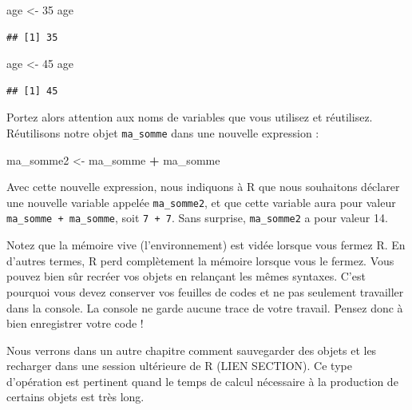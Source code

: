 \documentclass[
  11pt,
  french,
]{book}
\makeatletter
\newenvironment{Shaded}{\begin{snugshade}}{\end{snugshade}}
\newcommand{\DecValTok}[1]{\textcolor[rgb]{0.00,0.00,0.81}{#1}}
\newcommand{\NormalTok}[1]{#1}
\newcommand{\OperatorTok}[1]{\textcolor[rgb]{0.81,0.36,0.00}{\textbf{#1}}}
\newcommand{\StringTok}[1]{\textcolor[rgb]{0.31,0.60,0.02}{#1}}
\newenvironment{kframe}{%
\medskip{}
\setlength{\fboxsep}{.8em}
 \def\at@end@of@kframe{}%
 \ifinner\ifhmode%
  \def\at@end@of@kframe{\end{minipage}}%
  \begin{minipage}{\columnwidth}%
 \fi\fi%
 \def\FrameCommand##1{\hskip\@totalleftmargin \hskip-\fboxsep
 \colorbox{shadecolor}{##1}\hskip-\fboxsep
     \hskip-\linewidth \hskip-\@totalleftmargin \hskip\columnwidth}%
 \MakeFramed {\advance\hsize-\width
   \@totalleftmargin\z@ \linewidth\hsize
   \@setminipage}}%
 {\par\unskip\endMakeFramed%
 \at@end@of@kframe}
\renewenvironment{Shaded}{\begin{kframe}}{\end{kframe}}
\makeatother
\begin{document}
\begin{Shaded}
\begin{Highlighting}[]
\NormalTok{age <-}\StringTok{ }\DecValTok{35}
\NormalTok{age}
\end{Highlighting}
\end{Shaded}

\begin{verbatim}
## [1] 35
\end{verbatim}

\begin{Shaded}
\begin{Highlighting}[]
\NormalTok{age <-}\StringTok{ }\DecValTok{45}
\NormalTok{age}
\end{Highlighting}
\end{Shaded}

\begin{verbatim}
## [1] 45
\end{verbatim}

Portez alors attention aux noms de variables que vous utilisez et réutilisez. Réutilisons notre objet \texttt{ma\_somme} dans une nouvelle expression :

\begin{Shaded}
\begin{Highlighting}[]
\NormalTok{ma_somme2 <-}\StringTok{ }\NormalTok{ma_somme }\OperatorTok{+}\StringTok{ }\NormalTok{ma_somme}
\end{Highlighting}
\end{Shaded}

Avec cette nouvelle expression, nous indiquons à R que nous souhaitons déclarer une nouvelle variable appelée \texttt{ma\_somme2}, et que cette variable aura pour valeur \texttt{ma\_somme\ +\ ma\_somme}, soit \texttt{7\ +\ 7}. Sans surprise, \texttt{ma\_somme2} a pour valeur 14.

Notez que la mémoire vive (l'environnement) est vidée lorsque vous fermez R. En d'autres termes, R perd complètement la mémoire lorsque vous le fermez. Vous pouvez bien sûr recréer vos objets en relançant les mêmes syntaxes. C'est pourquoi vous devez conserver vos feuilles de codes et ne pas seulement travailler dans la console. La console ne garde aucune trace de votre travail. Pensez donc à bien enregistrer votre code !

Nous verrons dans un autre chapitre comment sauvegarder des objets et les recharger dans une session ultérieure de R (LIEN SECTION). Ce type d'opération est pertinent quand le temps de calcul nécessaire à la production de certains objets est très long.
\end{document}
